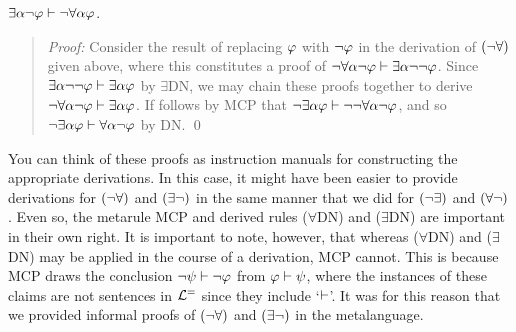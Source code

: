 \begin{Lthm}[$\exists\enot$] \label{lemma:ExistsNot}
     $\exists \alpha\neg\varphi \vdash \neg\forall \alpha\varphi$.
\end{Lthm}

\begin{quote}
  \textit{Proof:}
  Consider the result of replacing $\varphi$ with $\neg\varphi$ in the derivation of $(\neg\forall)$ given above, where this constitutes a proof of $\neg\forall \alpha\neg\varphi \vdash \exists \alpha\neg\neg\varphi$.
  Since $\exists \alpha\neg\neg\varphi \vdash \exists \alpha\varphi$ by $\exists$DN, we may chain these proofs together to derive $\neg\forall \alpha\neg\varphi \vdash \exists \alpha\varphi$.
  If follows by MCP that $\neg\exists \alpha\varphi \vdash \neg\neg\forall \alpha\neg\varphi$, and so $\neg\exists \alpha\varphi \vdash \forall \alpha\neg\varphi$ by DN. 
  \qed
\end{quote}

You can think of these proofs as instruction manuals for constructing the appropriate derivations.
In this case, it might have been easier to provide derivations for $(\neg\forall)$ and $(\exists\neg)$ in the same manner that we did for $(\neg\exists)$ and $(\forall\neg)$.
Even so, the metarule MCP and derived rules ($\forall$DN) and ($\exists$DN) are important in their own right.
It is important to note, however, that whereas ($\forall$DN) and ($\exists$DN) may be applied in the course of a derivation, MCP cannot.
This is because MCP draws the conclusion $\neg\psi \vdash \neg\varphi$ from $\varphi \vdash \psi$, where the instances of these claims are not sentences in $\mathcal{L}^{=}$ since they include `$\vdash$'.
It was for this reason that we provided informal proofs of $(\neg\forall)$ and $(\exists\neg)$ in the metalanguage. 








